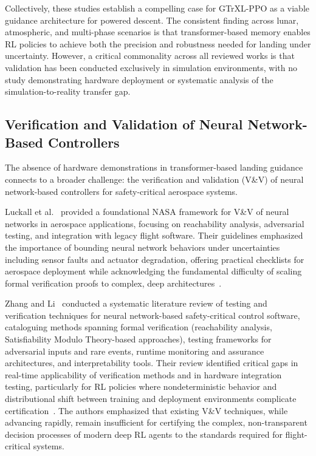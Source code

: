 \documentclass[10pt,twocolumn]{article}
\begin{document}
Collectively, these studies establish a compelling case for GTrXL-PPO as a viable guidance architecture for powered descent.
The consistent finding across lunar, atmospheric, and multi-phase scenarios is that transformer-based memory enables RL policies to achieve both the precision and robustness needed for landing under uncertainty.
However, a critical commonality across all reviewed works is that validation has been conducted exclusively in simulation environments, with no study demonstrating hardware deployment or systematic analysis of the simulation-to-reality transfer gap.

\subsection{Verification and Validation of Neural Network-Based Controllers}

The absence of hardware demonstrations in transformer-based landing guidance connects to a broader challenge: the verification and validation (V\&V) of neural network-based controllers for safety-critical aerospace systems.

Luckall et al.~\cite{luckall2002} provided a foundational NASA framework for V\&V of neural networks in aerospace applications, focusing on reachability analysis, adversarial testing, and integration with legacy flight software.
Their guidelines emphasized the importance of bounding neural network behaviors under uncertainties including sensor faults and actuator degradation, offering practical checklists for aerospace deployment while acknowledging the fundamental difficulty of scaling formal verification proofs to complex, deep architectures~\cite{luckall2002}.

Zhang and Li~\cite{zhang2020} conducted a systematic literature review of testing and verification techniques for neural network-based safety-critical control software, cataloguing methods spanning formal verification (reachability analysis, Satisfiability Modulo Theory-based approaches), testing frameworks for adversarial inputs and rare events, runtime monitoring and assurance architectures, and interpretability tools.
Their review identified critical gaps in real-time applicability of verification methods and in hardware integration testing, particularly for RL policies where nondeterministic behavior and distributional shift between training and deployment environments complicate certification~\cite{zhang2020}.
The authors emphasized that existing V\&V techniques, while advancing rapidly, remain insufficient for certifying the complex, non-transparent decision processes of modern deep RL agents to the standards required for flight-critical systems.
\end{document}
